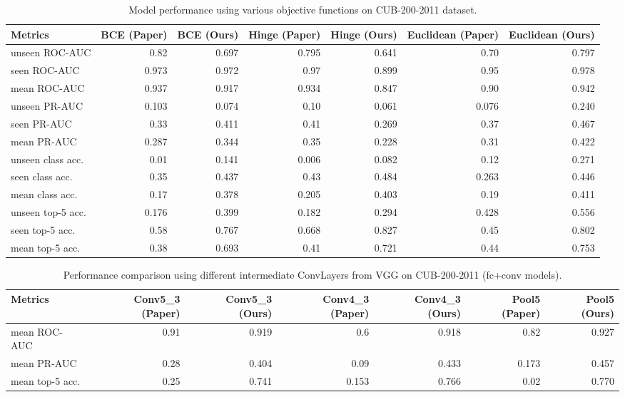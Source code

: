 \documentclass[11pt]{article}
\begin{document}
\begin{table}[t]
\centering
\scriptsize
\caption{Model performance using various objective functions on CUB-200-2011 dataset.}
\label{tab:table2}
\begin{tabular}{lrrrrrr}
\toprule
Metrics & BCE (Paper) & BCE (Ours) & Hinge (Paper) & Hinge (Ours) & Euclidean (Paper) & Euclidean (Ours) \\ \midrule
unseen ROC-AUC & 0.82 & 0.697 & 0.795 & 0.641 & 0.70 & 0.797 \\
seen ROC-AUC & 0.973 & 0.972 & 0.97 & 0.899 & 0.95 & 0.978 \\
mean ROC-AUC & 0.937 & 0.917 & 0.934 & 0.847 & 0.90 & 0.942 \\
unseen PR-AUC & 0.103 & 0.074 & 0.10 & 0.061 & 0.076 & 0.240 \\
seen PR-AUC & 0.33 & 0.411 & 0.41 & 0.269 & 0.37 & 0.467 \\
mean PR-AUC & 0.287 & 0.344 & 0.35 & 0.228 & 0.31 & 0.422 \\
unseen class acc. & 0.01 & 0.141 & 0.006 & 0.082 & 0.12 & 0.271 \\
seen class acc. & 0.35 & 0.437 & 0.43 & 0.484 & 0.263 & 0.446 \\
mean class acc. & 0.17 & 0.378 & 0.205 & 0.403 & 0.19 & 0.411 \\
unseen top-5 acc. & 0.176 & 0.399 & 0.182 & 0.294 & 0.428 & 0.556 \\
seen top-5 acc. & 0.58 & 0.767 & 0.668 & 0.827 & 0.45 & 0.802 \\
mean top-5 acc. & 0.38 & 0.693 & 0.41 & 0.721 & 0.44 & 0.753 \\
 \bottomrule
\end{tabular}
\end{table}


\begin{table}[t]
\centering
\scriptsize
\caption{Performance comparison using different intermediate ConvLayers from VGG on CUB-200-2011 (fc+conv models).}
\label{tab:table3}
\begin{tabular}{lrrrrrr}
\toprule
Metrics & Conv5\_3 (Paper) & Conv5\_3 (Ours) & Conv4\_3 (Paper) & Conv4\_3 (Ours) & Pool5 (Paper) & Pool5 (Ours) \\ \midrule
mean ROC-AUC & 0.91 & 0.919 & 0.6 & 0.918 & 0.82 & 0.927 \\
mean PR-AUC & 0.28 & 0.404 & 0.09 & 0.433 & 0.173 & 0.457 \\
mean top-5 acc. & 0.25 & 0.741 & 0.153 & 0.766 & 0.02 & 0.770 \\
 \bottomrule
\end{tabular}
\end{table}
\end{document}
